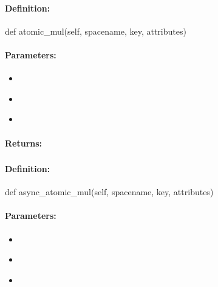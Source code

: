 \paragraph{Definition:}
\begin{pythoncode}
def atomic_mul(self, spacename, key, attributes)
\end{pythoncode}

\paragraph{Parameters:}
\begin{itemize}[noitemsep]
\item {}\\

\item {}\\

\item {}\\

\end{itemize}

\paragraph{Returns:}


\pagebreak
\subsubsection{}
\label{api:python:async_atomic_mul}


\paragraph{Definition:}
\begin{pythoncode}
def async_atomic_mul(self, spacename, key, attributes)
\end{pythoncode}

\paragraph{Parameters:}
\begin{itemize}[noitemsep]
\item {}\\

\item {}\\

\item {}\\

\end{itemize}

